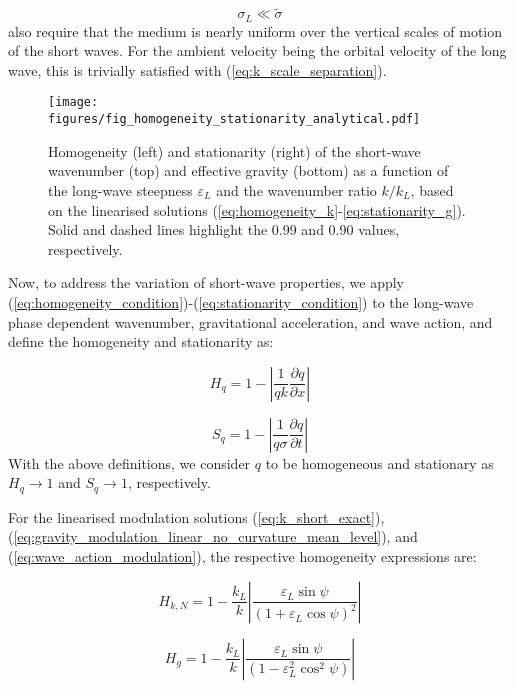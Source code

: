 \documentclass[lineno]{jfm}
\begin{document}
\begin{equation}
  \sigma_L \ll \widetilde{\sigma}
\end{equation}
\citet{bretherton1968wavetrains} also require that the medium is nearly uniform
over the vertical scales of motion of the short waves.
For the ambient velocity being the orbital velocity of the long wave, this is
trivially satisfied with (\ref{eq:k_scale_separation}).

\begin{figure}
\centering
\texttt{[image: figures/fig\_homogeneity\_stationarity\_analytical.pdf]}
\caption{
Homogeneity (left) and stationarity (right) of the short-wave wavenumber (top)
and effective gravity (bottom) as a function of the long-wave steepness
$\varepsilon_L$ and the wavenumber ratio $k/k_L$, based on the linearised
solutions (\ref{eq:homogeneity_k}-\ref{eq:stationarity_g}).
Solid and dashed lines highlight the 0.99 and 0.90 values, respectively.
}
\label{fig:homogeneity_stationarity_analytical}
\end{figure}

Now, to address the variation of short-wave properties,
we apply (\ref{eq:homogeneity_condition})-(\ref{eq:stationarity_condition}) to
the long-wave phase dependent wavenumber, gravitational acceleration, and
wave action, and define the homogeneity and stationarity as:

\begin{equation}
  H_q = 1 - \left| \frac{1}{qk} \frac{\partial q}{\partial x} \right|
\end{equation}

\begin{equation}
  S_q = 1 - \left| \frac{1}{q\sigma} \frac{\partial q}{\partial t} \right|
\end{equation}
With the above definitions, we consider $q$ to be homogeneous and stationary as
$H_q \rightarrow 1$ and $S_q \rightarrow 1$, respectively.

For the linearised modulation solutions (\ref{eq:k_short_exact}),
(\ref{eq:gravity_modulation_linear_no_curvature_mean_level}), and
(\ref{eq:wave_action_modulation}), the respective homogeneity expressions are:

\begin{equation}
  H_{k,N} = 1 - \frac{k_L}{k} \left| \frac{\varepsilon_L \sin{\psi}}{\left(1 + \varepsilon_L \cos{\psi}\right)^2} \right|
  \label{eq:homogeneity_k}
\end{equation}

\begin{equation}
  H_{g} = 1 - \frac{k_L}{k} \left| \frac{\varepsilon_L \sin{\psi}}{\left(1 - \varepsilon_L^2 \cos^2{\psi}\right)} \right|
  \label{eq:homogeneity_g}
\end{equation}
\end{document}

